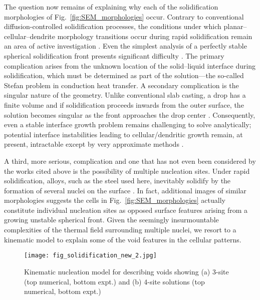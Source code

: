 \documentclass[11pt]{article}
\begin{document}
The question now remains of explaining why each of the solidification morphologies of Fig.~\ref{fig:SEM_morphologies} occur. Contrary to conventional diffusion-controlled solidification processes, the conditions under which planar--cellular--dendrite morphology transitions occur during rapid solidification remain an area of active investigation \cite{galenko1997local}. Even the simplest analysis of a perfectly stable spherical solidification front presents significant difficulty \cite{DavisHill1982, PrudhommeETAL1989}. The primary complication arises from the unknown location of the solid--liquid interface during solidification, which must be determined as part of the solution---the so-called Stefan problem in conduction heat transfer. A secondary complication is the singular nature of the geometry. Unlike conventional slab casting, a drop has a finite volume and if solidification proceeds inwards from the outer surface, the solution becomes singular as the front approaches the drop center \cite{mccue2008classical}. Consequently, even a stable interface growth problem remains challenging to solve analytically; potential interface instabilities leading to cellular/dendritic growth remain, at present, intractable except by very approximate methods \cite{gill1981rapid, gill1984rapid}.


A third, more serious, complication and one that has not even been considered by the works cited above is the possibility of multiple nucleation sites. Under rapid solidification, alloys, such as the steel used here, inevitably solidify by the formation of several nuclei on the surface \cite{levi1982heat, Markworth1988}. In fact, additional images of similar morphologies suggests the cells in Fig.~\ref{fig:SEM_morphologies} actually constitute individual nucleation sites as opposed surface features arising from a growing unstable spherical front. Given the seemingly insurmountable complexities of the thermal field surrounding multiple nuclei, we resort to a kinematic model to explain some of the void features in the cellular patterns. 


\begin{figure}[h]
\centering
\texttt{[image: fig\_solidification\_new\_2.jpg]}  
\caption{Kinematic nucleation model for describing voids showing (a) 3-site (top numerical, bottom expt.) and (b) 4-site solutions (top numerical, bottom expt.)}
\label{fig:solidification}
\end{figure}
\end{document}
